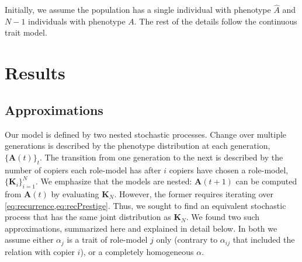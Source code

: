 \documentclass[12pt]{extarticle}
\let\vec\mathbf
\begin{document}
Initially, we assume the population has a single individual with phenotype $\hat{A}$ and $N-1$ individuals with phenotype $A$. The rest of the details follow the continuous trait model.

\section{Results}
\subsection{Approximations}
Our model is defined by two nested stochastic processes. Change over multiple generations is described by the phenotype distribution at each generation, $\{\vec{A}(t)\}_t$. The transition from one generation to the next is described by the number of copiers each role-model has after $i$ copiers have chosen a role-model, $\{\vec{K}_i\}_{i=1}^N$.
We emphasize that the models are nested: $\vec{A}(t+1)$ can be computed from $\vec{A}(t)$ by evaluating $\vec{K}_{N}$. However, the former requires iterating over \cref{eq:recurrence,eq:recPrestige}. Thus, we sought to find an equivalent stochastic process that has the same joint distribution as $\vec{K}_{N}$. 
We found two such approximations, summarized here and explained in detail below. In both we assume either $\alpha_j$ is a trait of role-model $j$ only (contrary to $\alpha_{ij}$ that included the relation with copier $i$), or a completely homogeneous $\alpha$.
\end{document}
